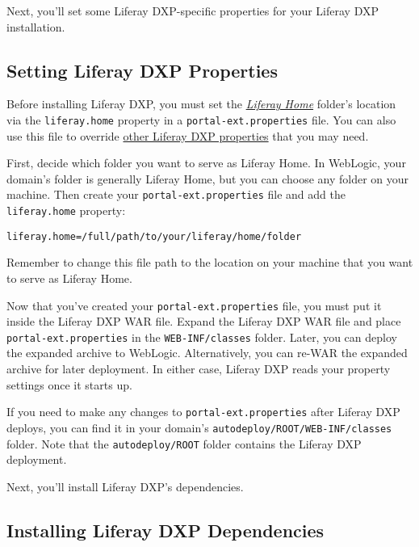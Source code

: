 Next, you'll set some Liferay DXP-specific properties for your Liferay
DXP installation.

\subsection{Setting Liferay DXP
Properties}\label{setting-liferay-dxp-properties}

Before installing Liferay DXP, you must set the
\href{/docs/7-1/deploy/-/knowledge_base/d/installing-liferay\#liferay-home}{\emph{Liferay
Home}} folder's location via the \texttt{liferay.home} property in a
\texttt{portal-ext.properties} file. You can also use this file to
override
\href{https://docs.liferay.com/dxp/portal/7.1-latest/propertiesdoc/portal.properties.html}{other
Liferay DXP properties} that you may need.

First, decide which folder you want to serve as Liferay Home. In
WebLogic, your domain's folder is generally Liferay Home, but you can
choose any folder on your machine. Then create your
\texttt{portal-ext.properties} file and add the \texttt{liferay.home}
property:

\begin{verbatim}
liferay.home=/full/path/to/your/liferay/home/folder
\end{verbatim}

Remember to change this file path to the location on your machine that
you want to serve as Liferay Home.

Now that you've created your \texttt{portal-ext.properties} file, you
must put it inside the Liferay DXP WAR file. Expand the Liferay DXP WAR
file and place \texttt{portal-ext.properties} in the
\texttt{WEB-INF/classes} folder. Later, you can deploy the expanded
archive to WebLogic. Alternatively, you can re-WAR the expanded archive
for later deployment. In either case, Liferay DXP reads your property
settings once it starts up.

If you need to make any changes to \texttt{portal-ext.properties} after
Liferay DXP deploys, you can find it in your domain's
\texttt{autodeploy/ROOT/WEB-INF/classes} folder. Note that the
\texttt{autodeploy/ROOT} folder contains the Liferay DXP deployment.

Next, you'll install Liferay DXP's dependencies.

\subsection{Installing Liferay DXP
Dependencies}\label{installing-liferay-dxp-dependencies-1}

